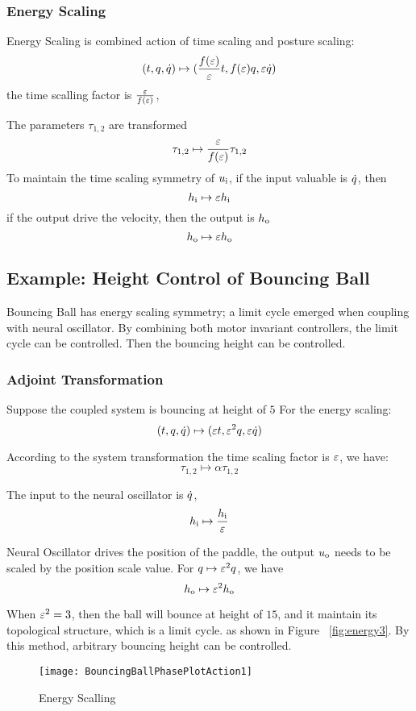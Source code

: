 \subsubsection*{ Energy Scaling}
Energy Scaling is combined action of time scaling and posture scaling:
\[
(t,q,\dot{q} ) \mapsto ( \frac{f(\varepsilon)}{\varepsilon}t ,f(\varepsilon)q,\varepsilon\dot{q})
\]
the time scalling factor is $\frac{\varepsilon}{f(\varepsilon)}$, 

The parameters $\tau_{1,2}$ are transformed
\[
\tau_{1,2} \mapsto \frac{\varepsilon}{f(\varepsilon)} \tau_{1,2}
\]
To maintain the time scaling symmetry of $u_{\mathrm{i}}$, if the input valuable is $\dot{q}$, 
then 
\[
h_{\mathrm{i}} \mapsto \varepsilon h_{\mathrm{i}}
\]
if the output drive the velocity, then the output is $h_{\mathrm{o}}$
\[
h_{\mathrm{o}} \mapsto \varepsilon h_{\mathrm{o}}
\]




\subsection{Example: Height Control of Bouncing Ball}

Bouncing Ball has energy scaling symmetry; a limit cycle emerged when coupling with neural oscillator.
By combining both motor invariant controllers, the limit cycle can be controlled.
Then the bouncing height can be controlled.

\subsubsection*{Adjoint Transformation}
Suppose the coupled system is bouncing at height of $5$
For the energy scaling:
\[
(t,q,\dot{q} ) \mapsto ( \varepsilon t ,\varepsilon^2 q,\varepsilon \dot{q})
\]

According to the system transformation
the time scaling factor is $\varepsilon$, we have:
\[
\tau_{1,2} \mapsto \alpha \tau_{1,2}
\]

The input to the neural oscillator is $\dot{q}$,
\[
h_{\mathrm{i}} \mapsto \frac{h_{\mathrm{i}}}{\varepsilon}
\]
 
Neural Oscillator drives the position of the paddle, the output $u_{\mathrm{o}}$ needs to be scaled by the position scale value.
For $q \mapsto \varepsilon^2q$, we have
\[
 h_{\mathrm{o}} \mapsto \varepsilon^2 h_{\mathrm{o}}
\]

When $\varepsilon^2=3$, then the ball will bounce at height of $15$, and it maintain its topological structure, which is a limit cycle.
as shown in Figure ~\ref{fig:energy3}. 
By this method, arbitrary bouncing height can be controlled.


\begin{figure}[!htbp]
  \begin{center}
   	\texttt{[image: BouncingBallPhasePlotAction1]}
    \caption{Energy Scalling}
    \label{fig:energy1}
  \end{center}
\end{figure} 



